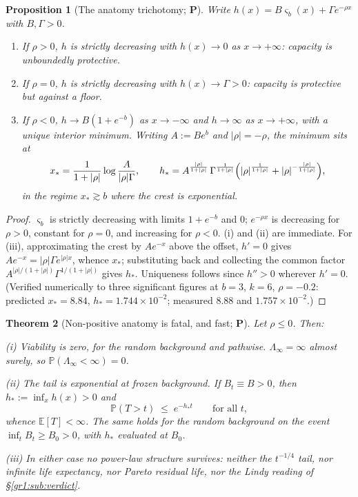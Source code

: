 \documentclass[11pt]{article}
\numberwithin{equation}{section}
\theoremstyle{plain}
\newtheorem{theorem}{Theorem}[section]
\newtheorem{proposition}[theorem]{Proposition}
\theoremstyle{definition}
\theoremstyle{remark}
\newcommand{\E}{\mathbb{E}}
\newcommand{\PP}{\mathbb{P}}
\begin{document}
\begin{proposition}[The anatomy trichotomy; \textbf{P}]
\label{gr1:prop:trichotomy}
Write $h(x)=B\varsigma_b(x)+\Gamma e^{-\rho x}$ with $B,\Gamma>0$.
\begin{enumerate}[label=\emph{(\roman*)},itemsep=1pt]
\item If $\rho>0$, $h$ is strictly decreasing with $h(x)\to0$ as
$x\to+\infty$: capacity is unboundedly protective.
\item If $\rho=0$, $h$ is strictly decreasing with
$h(x)\to\Gamma>0$: capacity is protective but against a floor.
\item If $\rho<0$, $h\to B(1+e^{-b})$ as $x\to-\infty$ and
$h\to\infty$ as $x\to+\infty$, with a unique interior minimum. Writing
$A:=Be^{b}$ and $|\rho|=-\rho$, the minimum sits at
\begin{equation}\label{gr1:eq:xstar}
x_\ast=\frac{1}{1+|\rho|}\log\frac{A}{|\rho|\Gamma},
\qquad
h_\ast=A^{\frac{|\rho|}{1+|\rho|}}\,\Gamma^{\frac{1}{1+|\rho|}}
\Bigl(|\rho|^{\frac{1}{1+|\rho|}}+|\rho|^{-\frac{|\rho|}{1+|\rho|}}\Bigr),
\end{equation}
in the regime $x_\ast\gtrsim b$ where the crest is exponential.
\end{enumerate}
\end{proposition}

\begin{proof}
$\varsigma_b$ is strictly decreasing with limits $1+e^{-b}$ and $0$;
$e^{-\rho x}$ is decreasing for $\rho>0$, constant for $\rho=0$, and
increasing for $\rho<0$. (i) and (ii) are immediate. For (iii),
approximating the crest by $Ae^{-x}$ above the offset, $h'=0$ gives
$Ae^{-x}=|\rho|\Gamma e^{|\rho|x}$, whence $x_\ast$; substituting back
and collecting the common factor
$A^{|\rho|/(1+|\rho|)}\Gamma^{1/(1+|\rho|)}$ gives $h_\ast$. Uniqueness
follows since $h''>0$ wherever $h'=0$. (Verified numerically to three
significant figures at $b=3$, $k=6$, $\rho=-0.2$: predicted
$x_\ast=8.84$, $h_\ast=1.744\times10^{-2}$; measured $8.88$ and
$1.757\times10^{-2}$.)
\end{proof}

\begin{theorem}[Non-positive anatomy is fatal, and fast; \textbf{P}]
\label{gr1:thm:trapped}
Let $\rho\le0$. Then:

\emph{(i) Viability is zero, for the random background and pathwise.}
$\Lambda_\infty=\infty$ almost surely, so $\PP(\Lambda_\infty<\infty)=0$.

\emph{(ii) The tail is exponential at frozen background.} If $B_t\equiv
B>0$, then $h_\ast:=\inf_x h(x)>0$ and
\begin{equation}\label{gr1:eq:trappedtail}
\PP(T>t)\;\le\;e^{-h_\ast t}\qquad\text{for all }t,
\end{equation}
whence $\E[T]<\infty$. The same holds for the random background on the
event $\inf_t B_t\ge B_0>0$, with $h_\ast$ evaluated at $B_0$.

\emph{(iii) In either case no power-law structure survives}: neither the
$t^{-1/4}$ tail, nor infinite life expectancy, nor Pareto residual life,
nor the Lindy reading of \S\ref{gr1:sub:verdict}.
\end{theorem}
\end{document}
